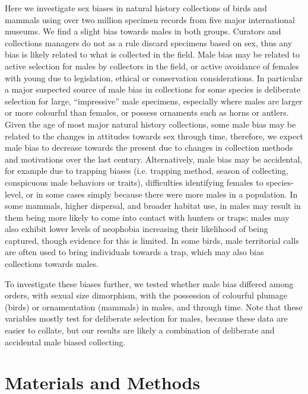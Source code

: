 \documentclass[a4paper, 12pt]{article}
\begin{document}
Here we investigate sex biases in natural history collections of birds and mammals using over two million specimen records from five major international museums.
We find a slight bias towards males in both groups.
Curators and collections managers do not as a rule discard specimens based on sex, thus any bias is likely related to what is collected in the field. 
Male bias may be related to active selection for males by collectors in the field, or active avoidance of females with young due to legislation, ethical or conservation considerations. 
In particular a major suspected source of male bias in collections for some species is deliberate selection for large, ``impressive'' male specimens, especially where males are larger or more colourful than females, or possess ornaments such as horns or antlers.
Given the age of most major natural history collections, some male bias may be related to the changes in attitudes towards sex through time, therefore, we expect male bias to decrease towards the present due to changes in collection methods and motivations over the last century. 
Alternatively, male bias may be accidental, for example due to trapping biases (i.e. trapping method, season of collecting, conspicuous male behaviors or traits), difficulties identifying females to species-level, or in some cases simply because there were more males in a population. 
In some mammals, higher dispersal, and broader habitat use, in males may result in them being more likely to come into contact with hunters or traps; males may also exhibit lower levels of neophobia increasing their likelihood of being captured, though evidence for this is limited\cite{crane2017patterns,laviola1992sexual}. 
In some birds, male territorial calls are often used to bring individuals towards a trap, which may also bias collections towards males.

To investigate these biases further, we tested whether male bias differed among orders, with sexual size dimorphism, with the possession of colourful plumage (birds) or ornamentation (mammals) in males, and through time. 
Note that these variables mostly test for deliberate selection for males, because these data are easier to collate, but our results are likely a combination of deliberate and accidental male biased collecting.

\newpage
\begin{landscape}
  
\end{landscape}

\section{Materials and Methods}
\end{document}
